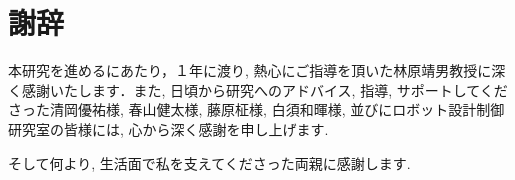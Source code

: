 \chapter*{謝辞}

本研究を進めるにあたり，１年に渡り, 熱心にご指導を頂いた林原靖男教授に深く感謝いたします．また, 日頃から研究へのアドバイス, 指導, サポートしてくださった清岡優祐様, 春山健太様, 藤原柾様, 白須和暉様, 並びにロボット設計制御研究室の皆様には, 心から深く感謝を申し上げます. 
\par そして何より, 生活面で私を支えてくださった両親に感謝します. 
%
